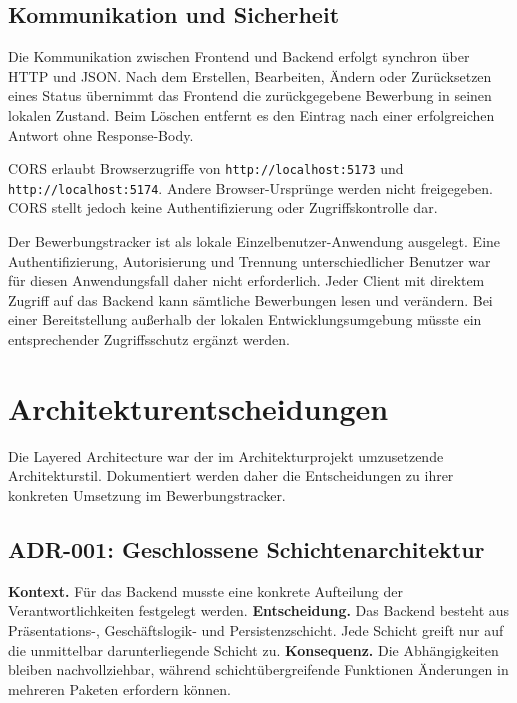 \documentclass[a4paper,11pt]{article}
\begin{document}
\subsection{Kommunikation und Sicherheit}

Die Kommunikation zwischen Frontend und Backend erfolgt synchron über HTTP und JSON.
Nach dem Erstellen, Bearbeiten, Ändern oder Zurücksetzen eines Status übernimmt das Frontend die zurückgegebene Bewerbung in seinen lokalen Zustand.
Beim Löschen entfernt es den Eintrag nach einer erfolgreichen Antwort ohne Response-Body.

CORS erlaubt Browserzugriffe von \texttt{http://localhost:5173} und \texttt{http://localhost:5174}.
Andere Browser-Ursprünge werden nicht freigegeben.
CORS stellt jedoch keine Authentifizierung oder Zugriffskontrolle dar.

Der Bewerbungstracker ist als lokale Einzelbenutzer-Anwendung ausgelegt.
Eine Authentifizierung, Autorisierung und Trennung unterschiedlicher Benutzer war für diesen Anwendungsfall daher nicht erforderlich.
Jeder Client mit direktem Zugriff auf das Backend kann sämtliche Bewerbungen lesen und verändern.
Bei einer Bereitstellung außerhalb der lokalen Entwicklungsumgebung müsste ein entsprechender Zugriffsschutz ergänzt werden.






\newpage
\section{Architekturentscheidungen}
\label{sec:architecture-decisions}

Die Layered Architecture war der im Architekturprojekt umzusetzende Architekturstil.
Dokumentiert werden daher die Entscheidungen zu ihrer konkreten Umsetzung im Bewerbungstracker.


\subsection{ADR-001: Geschlossene Schichtenarchitektur}

\textbf{Kontext.}
Für das Backend musste eine konkrete Aufteilung der Verantwortlichkeiten festgelegt werden.
\textbf{Entscheidung.}
Das Backend besteht aus Präsentations-, Geschäftslogik- und Persistenzschicht.
Jede Schicht greift nur auf die unmittelbar darunterliegende Schicht zu.
\textbf{Konsequenz.}
Die Abhängigkeiten bleiben nachvollziehbar, während schichtübergreifende Funktionen Änderungen in mehreren Paketen erfordern können.
\end{document}
